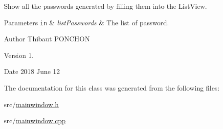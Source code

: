 Show all the passwords generated by filling them into the List\+View. 


\begin{DoxyParams}[1]{Parameters}
\mbox{\tt in}  & {\em list\+Passwords} & The list of password.\\
\hline
\end{DoxyParams}
\begin{DoxyAuthor}{Author}
Thibaut P\+O\+N\+C\+H\+ON 
\end{DoxyAuthor}
\begin{DoxyVersion}{Version}
1. 
\end{DoxyVersion}
\begin{DoxyDate}{Date}
2018 June 12 
\end{DoxyDate}


The documentation for this class was generated from the following files\+:\begin{DoxyCompactItemize}
\item 
src/\hyperlink{mainwindow_8h}{mainwindow.\+h}\item 
src/\hyperlink{mainwindow_8cpp}{mainwindow.\+cpp}\end{DoxyCompactItemize}
